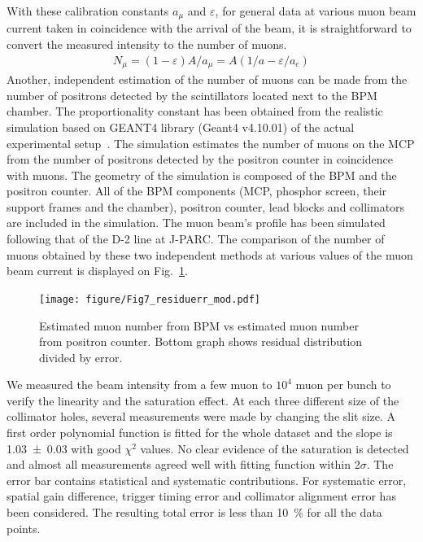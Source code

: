\documentclass[preprint,3p,twocolumn]{elsarticle}
\begin{document}
With these calibration constants $a_\mu$ and $\varepsilon$, for general data at various muon beam current taken in coincidence with the arrival of the beam, it is straightforward to convert the measured intensity to the number of muons.
{\fontsize{9pt}{0}
	\setlength{\mathindent}{0pt}
	\setlength{\abovedisplayskip}{5pt}
	\setlength{\belowdisplayskip}{5pt}
	\begin{equation}
	\begin{split}
	N_{\mu}=(1-\varepsilon)A/a_\mu=A(1/a-\varepsilon/a_e)
	\end{split}
	\end{equation}
}
\indent
Another, independent estimation of the number of muons can be made from the number of positrons detected by the scintillators located next to the BPM chamber. The proportionality constant has been obtained from the realistic simulation based on GEANT4 library (Geant4 v4.10.01) of the actual experimental setup~\cite{geant4}. 
The simulation estimates the number of muons on the MCP from the number of positrons detected by the positron counter in coincidence with muons. 
The geometry of the simulation is composed of the BPM and the positron counter. 
All of the BPM components (MCP, phosphor screen, their support frames and the chamber), positron counter, lead blocks and collimators are included in the simulation. The muon beam's profile has been simulated following that of the D-2 line at J-PARC. The comparison of the number of muons obtained by these two independent methods at various values of the muon beam current is displayed on Fig.~\ref{fig:muvsmu}. 

\begin{figure}[htb]
	\vspace{-0.15cm}
	\begin{minipage}[t]{60mm}
		\texttt{[image: figure/Fig7\_residuerr\_mod.pdf]}
	\end{minipage}
	\caption{Estimated muon number from BPM vs estimated muon number from positron counter.
	Bottom graph shows residual distribution divided by error.}
\vspace{-0.2cm}
	\label{fig:muvsmu}
\end{figure}
We measured the beam intensity from a few muon to $10^{4}$ muon per bunch to verify the linearity and the saturation effect. At each three different size of the collimator holes, several measurements were made by changing the slit size.
A first order polynomial function is fitted for the whole dataset and the slope is \num{1.03\pm 0.03} with good $\chi^{2}$ values.
No clear evidence of the saturation is detected and almost all measurements agreed well with fitting function within 2$\sigma$.
The error bar contains statistical and systematic contributions.
For systematic error, spatial gain difference, trigger timing error and collimator alignment error has been considered. The resulting total error is less than \SI{10}{\percent} for all the data points.
 
\end{document}

